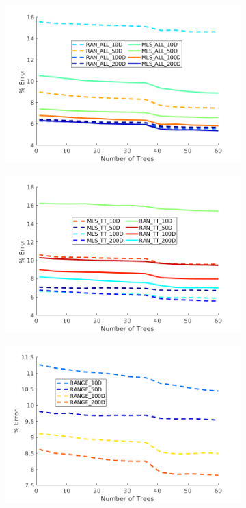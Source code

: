 \documentclass[journal,onecolumn]{IEEEtran}
\begin{document}
	\begin{figure}[H]
		\centering
		\begin{subfigure}{0.45\textwidth}
			\centering
			\includegraphics[width=1\linewidth]{figures/RAN_MLS_ALL}
			\caption[]{}
			\label{fig:all_mls_ransac_comp}
		\end{subfigure}
		\begin{subfigure}{0.45\textwidth}
			\centering
			\includegraphics[width=1\linewidth]{figures/RAN_MLS_TT}
			\caption[]{}
			\label{fig:xyz_mls_ransac_comp}
		\end{subfigure}
		\label{fig:xyz_mls_comp_1}
		\begin{subfigure}{0.45\textwidth}
			\centering
			\includegraphics[width=1\linewidth]{figures/Range}

\end{subfigure}
\end{figure}
\end{document}

